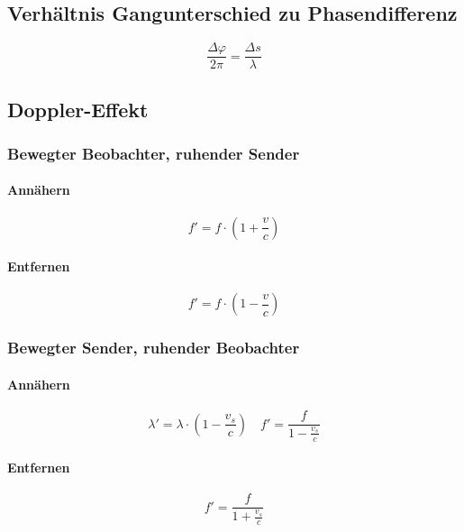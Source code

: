 \subsection{Verhältnis Gangunterschied zu Phasendifferenz}
\begin{equation}\label{eq:gangunterschied:phasendifferenz}
\frac{\Delta\varphi}{2\pi} = \frac{\Delta s}{\lambda}
\end{equation}

\subsection{Doppler-Effekt}
\subsubsection{Bewegter Beobachter, ruhender Sender}
\paragraph{Annähern}
\begin{equation}\label{eq:doppler:effekt:bewegter:beobachter:annaehern}
f' = f\cdot\left(1 + \frac{v}{c} \right)
\end{equation}

\paragraph{Entfernen}
\begin{equation}\label{eq:doppler:effekt:bewegter:beobachter:entfernen}
f' = f\cdot\left(1 - \frac{v}{c} \right)
\end{equation}

\subsubsection{Bewegter Sender, ruhender Beobachter}
\paragraph{Annähern}
\begin{equation}\label{eq:doppler:effekt:bewegter:sender:annaehern}
\lambda' = \lambda \cdot\left(1 - \frac{v_s}{c} \right) \quad
f' = \frac{f}{1 - \frac{v_s}{c}}
\end{equation}

\paragraph{Entfernen}
\begin{equation}\label{eq:doppler:effekt:bewegter:sender:entfernen}
f' = \frac{f}{1 + \frac{v_s}{c}}
\end{equation}

